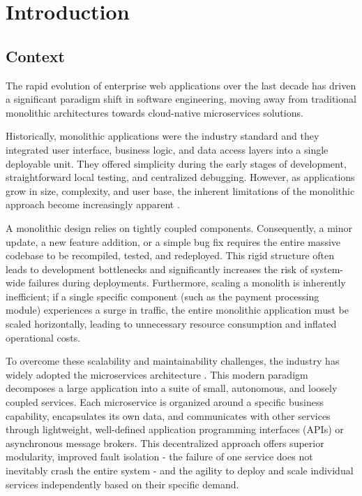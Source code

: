 \chapter{Introduction}
\label{sec:introduction}

\section[Context]{Context}

The rapid evolution of enterprise web applications over the last decade has driven a significant paradigm shift in software engineering, moving away from traditional monolithic architectures towards cloud-native microservices solutions. 

Historically, monolithic applications were the industry standard and they integrated user interface, business logic, and data access layers into a single deployable unit.
They offered simplicity during the early stages of development, straightforward local testing, and centralized debugging. However, as applications grow in size, complexity, and user base, the inherent limitations of the monolithic approach become increasingly apparent \cite{moving_from_monolithic_to_microservices}.

A monolithic design relies on tightly coupled components. Consequently, a minor update, a new feature addition, or a simple bug fix requires the entire massive codebase to be recompiled, tested, and redeployed. This rigid structure often leads to development bottlenecks and significantly increases the risk of system-wide failures during deployments. Furthermore, scaling a monolith is inherently inefficient; if a single specific component (such as the payment processing module) experiences a surge in traffic, the entire monolithic application must be scaled horizontally, leading to unnecessary resource consumption and inflated operational costs. 

To overcome these scalability and maintainability challenges, the industry has widely adopted the microservices architecture \cite{moving_from_monolithic_to_microservices}. This modern paradigm decomposes a large application into a suite of small, autonomous, and loosely coupled services. Each microservice is organized around a specific business capability, encapsulates its own data, and communicates with other services through lightweight, well-defined application programming interfaces (APIs) or asynchronous message brokers. This decentralized approach offers superior modularity, improved fault isolation - the failure of one service does not inevitably crash the entire system - and the agility to deploy and scale individual services independently based on their specific demand. 

